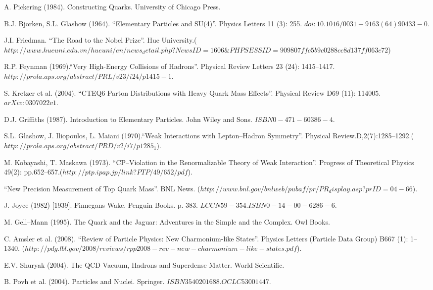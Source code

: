 \documentclass[12pt]{article}
\theoremstyle{plain}
\theoremstyle{definition}
\numberwithin{equation}{section}
\begin{document}
\begin{thebibliography}{99}
A. Pickering (1984). Constructing Quarks. University of Chicago Press.

B.J. Bjorken, S.L. Glashow (1964). ``Elementary Particles and SU(4)''. Physics Letters 11 (3): 255. $doi:10.1016/0031-9163(64)90433-0$.

J.I. Friedman. ``The Road to the Nobel Prize''. Hue University.($http://www.hueuni.edu.vn/hueuni/en/news_detail.php?NewsID=1606\&PHPSESSID=909807ffc5b9c0288cc8d137ff063c72$)

R.P. Feynman (1969).``Very High-Energy Collisions of Hadrons''. Physical Review Letters 23 (24): 1415--1417.$http://prola.aps.org/abstract/PRL/v23/i24/p1415-1$.

S. Kretzer et al. (2004). ``CTEQ6 Parton Distributions with Heavy Quark Mass Effects''. Physical Review D69 (11): 114005. $arXiv:0307022v1$.

D.J. Griffiths (1987). Introduction to Elementary Particles. John Wiley and Sons. $ISBN 0-471-60386-4$.

S.L. Glashow, J. Iliopoulos, L. Maiani (1970).``Weak Interactions with
Lepton--Hadron Symmetry''. Physical Review.D,2(7):1285--1292.($http://prola.aps.org/abstract/PRD/v2/i7/p1285_1$).

M. Kobayashi, T. Maskawa (1973). ``CP--Violation in the Renormalizable Theory of Weak Interaction''. Progress of Theoretical Physics 49(2): pp.652--657.($http://ptp.ipap.jp/link?PTP/49/652/pdf$).

``New Precision Measurement of Top Quark Mass''. BNL News. ($http://www.bnl.gov/bnlweb/pubaf/pr/PR_display.asp?prID=04-66$).

J. Joyce (1982) [1939]. Finnegans Wake. Penguin Books. p. 383. $LCCN 59-354. ISBN 0-14-00-6286-6$.

M. Gell--Mann (1995). The Quark and the Jaguar: Adventures in the Simple and the Complex. Owl Books.

C. Amsler et al. (2008). ``Review of Particle Physics: New Charmonium-like States''. Physics Letters (Particle Data Group) B667 (1): 1--1340.
($http://pdg.lbl.gov/2008/reviews/rpp2008-rev-new-charmonium-like-states.pdf$).

E.V. Shuryak (2004). The QCD Vacuum, Hadrons and Superdense Matter. World Scientific.

B. Povh et al. (2004). Particles and Nuclei. Springer. $ISBN 3540201688. OCLC 53001447$.


\end{thebibliography}
\end{document}
